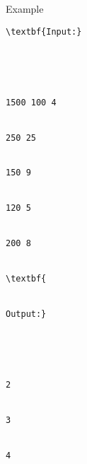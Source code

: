 Example
\begin{verbatim}
\textbf{Input:}





1500 100 4


250 25


150 9


120 5


200 8


\textbf{


Output:}





2


3


4


\end{verbatim}